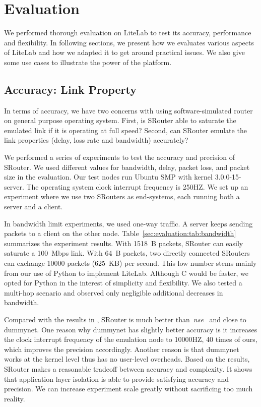 \documentclass[conference]{IEEEtran}
\begin{document}
\section{Evaluation}
\label{sec:evaluation}





We performed thorough evaluation on LiteLab to test its accuracy,
performance and flexibility. In following sections, we present how we
evaluates various aspects of LiteLab and how we adapted it to get
around practical issues. We also give some use cases to illustrate the
power of the platform.

\subsection{Accuracy: Link Property}
\label{sec:evaluation:validate}

In terms of accuracy, we have two concerns with using
software-simulated router on general purpose operating system.  First,
is SRouter able to saturate the emulated link if it is operating at
full speed? Second, can SRouter emulate the link properties (delay,
loss rate and bandwidth) accurately?

We performed a series of experiments to test the accuracy and
precision of SRouter. We used different values for bandwidth, delay,
packet loss, and packet size in the evaluation. Our test nodes run
Ubuntu SMP with kernel 3.0.0-15-server. The operating system clock
interrupt frequency is 250HZ.
We set up an experiment where we use two SRouters as end-systems, each
running both a server and a client.


In bandwidth limit experiments, we used one-way traffic. A server
keeps sending packets to a client on the other
node. Table~\ref{sec:evaluation:tab:bandwidth} summarizes the
experiment results.  With 1518~B packets, SRouter can easily saturate
a 100~Mbps link. With 64~B packets, two directly connected SRouters
can exchange 10000 packets (625~KB) per second. This low number stems
mainly from our use of Python to implement LiteLab. Although C would
be faster, we opted for Python in the interest of simplicity and
flexibility.
We also tested a multi-hop scenario and observed only negligible
additional decreases in bandwidth.


Compared with the results in \cite{White:osdi02}, SRouter is much
better than~\textit{nse}~\cite{780820} and close to dummynet. One
reason why dummynet has slightly better accuracy is it increases the
clock interrupt frequency of the emulation node to 10000HZ, 40 times
of ours, which improves the precision accordingly. Another reason is
that dummynet works at the kernel level thus has no user-level
overheads. Based on the results, SRouter makes a reasonable tradeoff
between accuracy and complexity. It shows that application layer
isolation is able to provide satisfying accuracy and precision.  We
can increase experiment scale greatly without sacrificing too much
reality.
\end{document}
